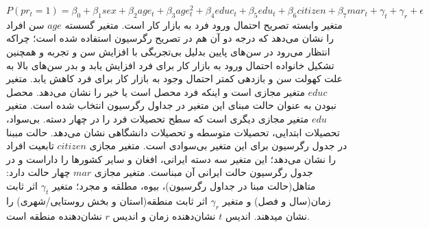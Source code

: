 \documentclass[12pt, a4paper]{article}
\begin{document}
\begin{equation}
	\label{eq1}
P(pr_t=1)=\beta_0 + \beta_1 sex+ \beta_2 age_t + \beta_3 age_t^2 + \beta_4 educ_t+ \beta_5 edu_t +\beta_6 citizen + \beta_7 mar_t + \gamma_t + \gamma_r+\epsilon
\end{equation}
متغیر وابسته تصریح احتمال ورود فرد به بازار کار است. متغیر گسسته $age$ سن افراد را نشان می‌دهد که  درجه دو آن هم در تصریح رگرسیون استفاده شده است؛ چراکه انتظار می‌رود در سن‌های پایین بدلیل بی‌تجربگی با افزایش سن و تجربه  و همچنین تشکیل خانواده احتمال ورود به بازار کار برای فرد افزایش یابد و بدر سن‌های بالا به علت کهولت سن و بازدهی کمتر احتمال وجود به بازار کار برای فرد کاهش یابد. متغیر $educ$ متغیر مجازی است و اینکه فرد محصل است یا خیر را نشان می‌دهد. محصل نبودن  به عنوان حالت مبنای این متغیر در جداول رگرسیون انتخاب شده است. متغیر $edu$ متغیر مجازی دیگری است که سطح تحصیلات فرد را در چهار دسته. بی‌سواد، تحصیلات ابتدایی، تحصیلات متوسطه و تحصیلات دانشگاهی نشان می‌دهد.  حالت مببنا در جدول رگرسیون  برای این متغیر بی‌سوادی است. متغیر مجازی $citizen$ تابعیت افراد را نشان می‌دهد؛ این متغیر سه دسته ایرانی، افغان و سایر کشورها را داراست و در جدول رگرسیون حالت ایرانی آن مبناست. متغیر مجازی $mar$ چهار حالت دارد: متاهل(حالت مبنا در جداول رگرسیون)، بیوه، مطلقه و مجرد؛ متغیر $\gamma_t$ اثر ثابت زمان(سال و فصل) و متغیر $\gamma_r$ اثر ثابت منطقه(استان و بخش روستایی/شهری) را نشان میدهند. اندیس $t$ نشان‌دهنده زمان و اندیس $r$ نشان‌دهنده منطقه است.
\end{document}
